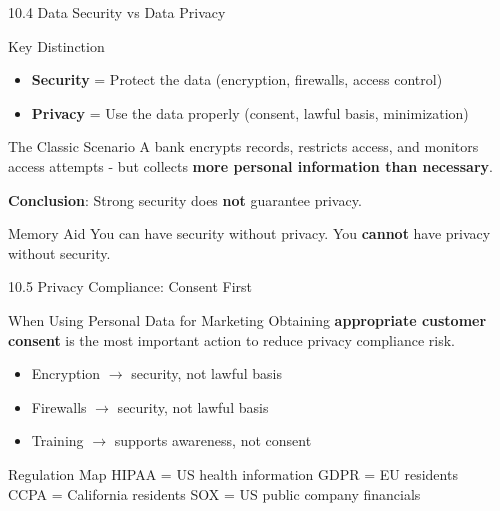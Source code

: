\documentclass{beamer}
\begin{document}
	\begin{frame}{10.4 Data Security vs Data Privacy}
		\begin{block}{Key Distinction}
			\begin{itemize}
				\item \textbf{Security} = Protect the data (encryption, firewalls, access control)
				\item \textbf{Privacy} = Use the data properly (consent, lawful basis, minimization)
			\end{itemize}
		\end{block}
		
		\begin{alertblock}{The Classic Scenario}
			A bank encrypts records, restricts access, and monitors access attempts - but collects \textbf{more personal information than necessary}.
			
			\textbf{Conclusion}: Strong security does \textbf{not} guarantee privacy.
		\end{alertblock}
		
		\begin{exampleblock}{Memory Aid}
			You can have security without privacy. You \textbf{cannot} have privacy without security.
		\end{exampleblock}
	\end{frame}
	
	\begin{frame}{10.5 Privacy Compliance: Consent First}
		\begin{block}{When Using Personal Data for Marketing}
			Obtaining \textbf{appropriate customer consent} is the most important action to reduce privacy compliance risk.
		\end{block}
		
		\begin{itemize}
			\item Encryption $\rightarrow$ security, not lawful basis
			\item Firewalls $\rightarrow$ security, not lawful basis
			\item Training $\rightarrow$ supports awareness, not consent
		\end{itemize}
		
		\begin{alertblock}{Regulation Map}
			HIPAA = US health information \quad GDPR = EU residents \\
			CCPA = California residents \quad SOX = US public company financials
		\end{alertblock}
	\end{frame}
	
\end{document}
